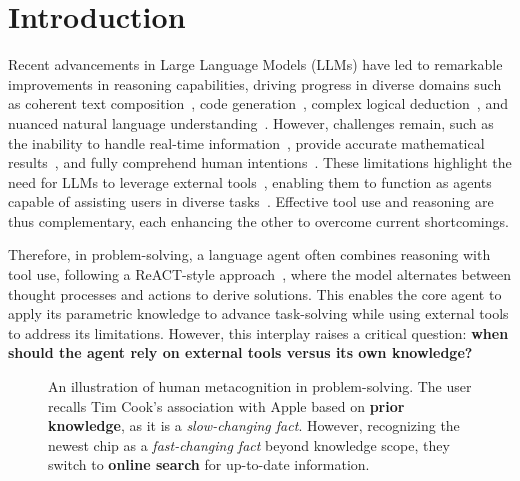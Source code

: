 \section{Introduction}

Recent advancements in Large Language Models (LLMs) \citep{ouyang2022training,team2023gemini,dubey2024llama} have led to remarkable improvements in reasoning capabilities, driving progress in diverse domains such as coherent text composition~\citep{wei2023chainofthought}, code generation~\citep{gao2023pal, Opendevin2024, SWEGym2024}, complex logical deduction~\citep{yao2023react, yao2024tree}, and nuanced natural language understanding~\citep{wang2023interactive, yu2024natural, wu2024individual}.
However, challenges remain, such as the inability to handle real-time information~\cite{yu2024information}, provide accurate mathematical results~\citep{lu2022survey}, and fully comprehend human intentions~\cite{qian2024tell}. These limitations highlight the need for LLMs to leverage external tools~\citep{schick2023toolformer, qin2023tool, yuan2024craft, qian2024escapebench}, enabling them to function as agents capable of assisting users in diverse tasks~\citep{qin2023toolllm, xi2023rise}. Effective tool use and reasoning are thus complementary, each enhancing the other to overcome current shortcomings.

Therefore, in problem-solving, a language agent often combines reasoning with tool use, following a ReACT-style approach~\citep{yao2023react}, where the model alternates between thought processes and actions to derive solutions. This enables the core agent to apply its parametric knowledge to advance task-solving while using external tools to address its limitations. However, this interplay raises a critical question: \textbf{when should the agent rely on external tools versus its own knowledge?}

\begin{figure}[!t]
    \centering
    \vspace{-5mm}
    \caption{An illustration of human metacognition in problem-solving. The user recalls Tim Cook’s association with Apple based on \textbf{prior knowledge}, as it is a \textit{slow-changing fact}. However, recognizing the newest chip as a \textit{fast-changing fact} beyond knowledge scope, they switch to \textbf{online search} for up-to-date information.}
    \label{fig:intro_metacognition}
    \vspace{-5mm}
\end{figure}

